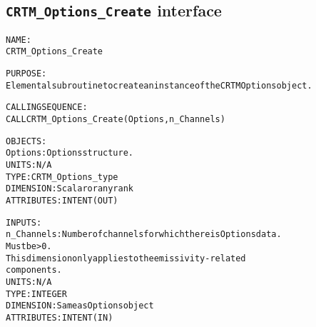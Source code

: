 \subsection{\texttt{CRTM\_Options\_Create} interface}
  \label{sec:CRTM_Options_Create_interface}
  \begin{alltt}
 
  NAME:
        CRTM_Options_Create
  
  PURPOSE:
        Elemental subroutine to create an instance of the CRTM Options object.
 
  CALLING SEQUENCE:
        CALL CRTM_Options_Create( Options, n_Channels )
 
  OBJECTS:
        Options:      Options structure.
                      UNITS:      N/A
                      TYPE:       CRTM_Options_type
                      DIMENSION:  Scalar or any rank
                      ATTRIBUTES: INTENT(OUT)
 
  INPUTS:
        n_Channels:   Number of channels for which there is Options data.
                      Must be > 0.
                      This dimension only applies to the emissivity-related
                      components.
                      UNITS:      N/A
                      TYPE:       INTEGER
                      DIMENSION:  Same as Options object
                      ATTRIBUTES: INTENT(IN)
 
  \end{alltt}

